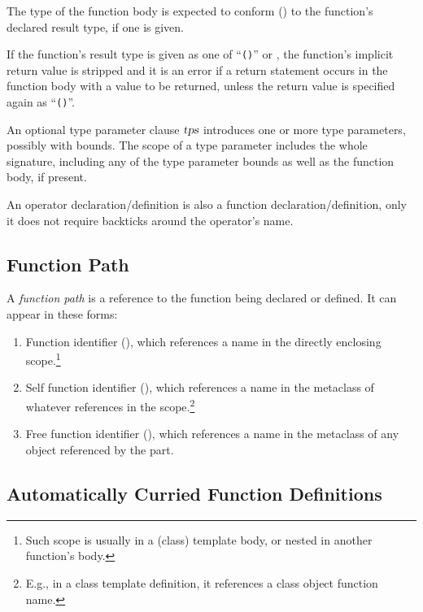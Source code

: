 The type of the function body is expected to conform () to the function's declared result type, if one is given. 

If the function's result type is given as one of ``\lstinline!()!'' or , the function's implicit return value is stripped and it is an error if a return statement occurs in the function body with a value to be returned, unless the return value is specified again as ``\lstinline!()!''.

An optional type parameter clause $\mbox{\sl tps}$ introduces one or more type parameters, possibly with bounds. The scope of a type parameter includes the whole signature, including any of the type parameter bounds as well as the function body, if present. 

An operator declaration/definition is also a function declaration/definition, only it does not require backticks around the operator's name. 





\subsection{Function Path}

A {\em function path} is a reference to the function being declared or defined. It can appear in these forms:

\begin{enumerate}
  \item Function identifier (), which references a name in the directly enclosing scope.\footnote{Such scope is usually in a (class) template body, or nested in another function's body.}
  \item Self function identifier (), which references a name in the metaclass of whatever  references in the scope.\footnote{E.g., in a class template definition, it references a class object function name.} 
  \item Free function identifier (), which references a name in the metaclass of any object referenced by the  part.
\end{enumerate}





\subsection{Automatically Curried Function Definitions}

